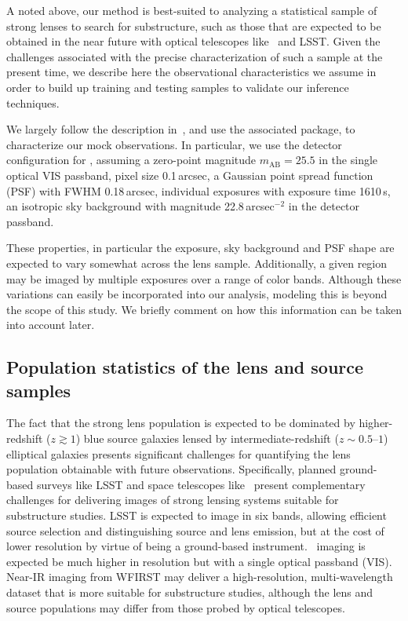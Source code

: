 \documentclass[twocolumn]{aastex62}
\begin{document}
A noted above, our method is best-suited to analyzing a statistical sample of strong lenses to search for substructure, such as those that are expected to be obtained in the near future with optical telescopes like \Euclid~and LSST. Given the challenges associated with the precise characterization of such a sample at the present time, we describe here the observational characteristics we assume in order to build up training and testing samples to validate our inference techniques.

We largely follow the description in~\citet{2015ApJ...811...20C}, and use the associated  package, to characterize our mock observations. In particular, we use the detector configuration for \Euclid, assuming a zero-point magnitude $m_\mathrm{AB} = 25.5$ in the single optical VIS passband, pixel size 0.1\,arcsec, a Gaussian point spread function (PSF) with FWHM 0.18\,arcsec, individual exposures with exposure time 1610\,s, an isotropic sky background with magnitude 22.8\,arcsec$^{-2}$ in the detector passband.

These properties, in particular the exposure, sky background and PSF shape are expected to vary somewhat across the lens sample. Additionally, a given region may be imaged by multiple exposures over a range of color bands. Although these variations can easily be incorporated into our analysis, modeling this is beyond the scope of this study. We briefly comment on how this information can be taken into account later.

\subsection{Population statistics of the lens and source samples}
\label{sec:populations}

The fact that the strong lens population is expected to be dominated by higher-redshift ($z\gtrsim1$) blue source galaxies lensed by intermediate-redshift ($z\sim 0.5$--$1$) elliptical galaxies presents significant challenges for quantifying the lens population obtainable with future observations. Specifically, planned ground-based surveys like LSST and space telescopes like \Euclid~present complementary challenges for delivering images of strong lensing systems suitable for substructure studies. LSST is expected to image in six bands, allowing efficient source selection and distinguishing source and lens emission, but at the cost of lower resolution by virtue of being a ground-based instrument. \Euclid~imaging is expected be much higher in resolution but with a single optical passband (VIS). Near-IR imaging from WFIRST may deliver a high-resolution, multi-wavelength dataset that is more suitable for substructure studies, although the lens and source populations may differ from those probed by optical telescopes.
\end{document}
